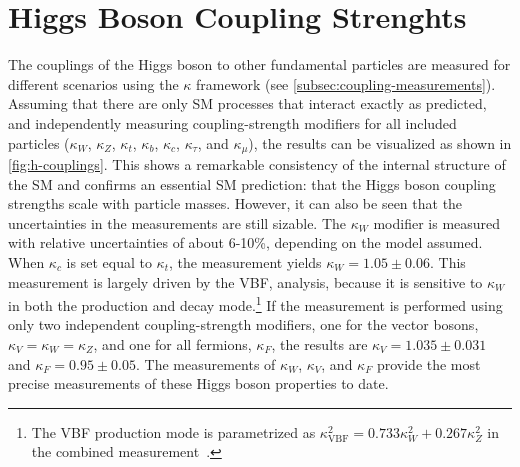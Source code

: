 \section{Higgs Boson Coupling Strenghts}
The couplings of the Higgs boson to other fundamental particles are measured for different scenarios using the $\kappa$ framework (see \cref{subsec:coupling-measurements}).
Assuming that there are only SM processes that interact exactly as predicted, and independently measuring coupling-strength modifiers for all included particles ($\kappa_W$, $\kappa_Z$, $\kappa_t$, $\kappa_b$, $\kappa_c$, $\kappa_\tau$, and $\kappa_\mu$), the results can be visualized as shown in \cref{fig:h-couplings}. 
This shows a remarkable consistency of the internal structure of the SM and confirms an essential SM prediction: that the Higgs boson coupling strengths scale with particle masses.
However, it can also be seen that the uncertainties in the measurements are still sizable. 
The $\kappa_W$ modifier is measured with relative uncertainties of about 6-10\%, depending on the model assumed. 
When $\kappa_c$ is set equal to $\kappa_t$, the measurement yields $\kappa_W = 1.05 \pm 0.06$.
This measurement is largely driven by the VBF, \HWW analysis, because it is sensitive to $\kappa_W$ in both the production and decay mode.\footnote{The VBF production mode is parametrized as $\kappa_\mathrm{VBF}^2 = 0.733 \kappa^2_W + 0.267 \kappa^2_Z$ in the combined measurement~\cite{NaturePaper}.}
If the measurement is performed using only two independent coupling-strength modifiers, one for the vector bosons, $\kappa_V = \kappa_W = \kappa_Z$, and one for all fermions, $\kappa_F$, the results are $\kappa_V = 1.035 \pm 0.031$ and $\kappa_F = 0.95 \pm 0.05$. 
The measurements of $\kappa_W$, $\kappa_V$, and $\kappa_F$ provide the most precise measurements of these Higgs boson properties to date.

